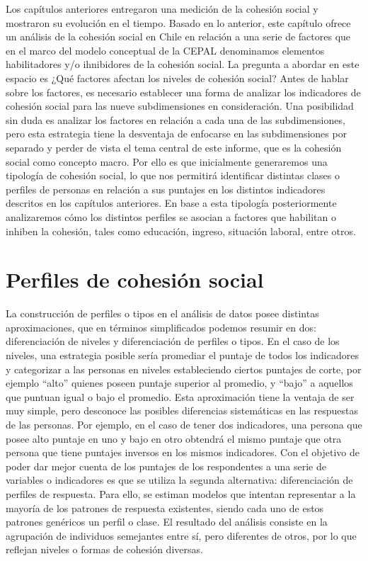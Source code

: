 \documentclass[
  12pt,
]{book}
\begin{document}
Los capítulos anteriores entregaron una medición de la cohesión social y mostraron su evolución en el tiempo. Basado en lo anterior, este capítulo ofrece un análisis de la cohesión social en Chile en relación a una serie de factores que en el marco del modelo conceptual de la CEPAL denominamos elementos habilitadores y/o ihnibidores de la cohesión social. La pregunta a abordar en este espacio es ¿Qué factores afectan los niveles de cohesión social? Antes de hablar sobre los factores, es necesario establecer una forma de analizar los indicadores de cohesión social para las nueve subdimensiones en consideración. Una posibilidad sin duda es analizar los factores en relación a cada una de las subdimensiones, pero esta estrategia tiene la desventaja de enfocarse en las subdimensiones por separado y perder de vista el tema central de este informe, que es la cohesión social como concepto macro. Por ello es que inicialmente generaremos una tipología de cohesión social, lo que nos permitirá identificar distintas clases o perfiles de personas en relación a sus puntajes en los distintos indicadores descritos en los capítulos anteriores. En base a esta tipología posteriormente analizaremos cómo los distintos perfiles se asocian a factores que habilitan o inhiben la cohesión, tales como educación, ingreso, situación laboral, entre otros.

\hypertarget{perfiles-de-cohesiuxf3n-social}{%
\section{Perfiles de cohesión social}\label{perfiles-de-cohesiuxf3n-social}}

La construcción de perfiles o tipos en el análisis de datos posee distintas aproximaciones, que en términos simplificados podemos resumir en dos: diferenciación de niveles y diferenciación de perfiles o tipos. En el caso de los niveles, una estrategia posible sería promediar el puntaje de todos los indicadores y categorizar a las personas en niveles estableciendo ciertos puntajes de corte, por ejemplo ``alto'' quienes poseen puntaje superior al promedio, y ``bajo'' a aquellos que puntuan igual o bajo el promedio. Esta aproximación tiene la ventaja de ser muy simple, pero desconoce las posibles diferencias sistemáticas en las respuestas de las personas. Por ejemplo, en el caso de tener dos indicadores, una persona que posee alto puntaje en uno y bajo en otro obtendrá el mismo puntaje que otra persona que tiene puntajes inversos en los mismos indicadores. Con el objetivo de poder dar mejor cuenta de los puntajes de los respondentes a una serie de variables o indicadores es que se utiliza la segunda alternativa: diferenciación de perfiles de respuesta. Para ello, se estiman modelos que intentan representar a la mayoría de los patrones de respuesta existentes, siendo cada uno de estos patrones genéricos un perfil o clase. El resultado del análisis consiste en la agrupación de individuos semejantes entre sí, pero diferentes de otros, por lo que reflejan niveles o formas de cohesión diversas.
\end{document}
